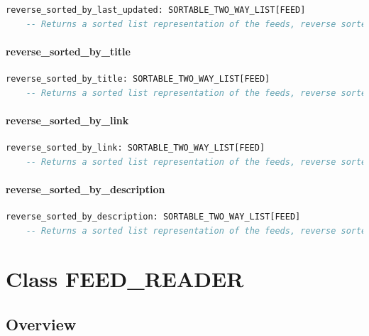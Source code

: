 \begin{lstlisting}[language=Eiffel]
reverse_sorted_by_last_updated: SORTABLE_TWO_WAY_LIST[FEED]
    -- Returns a sorted list representation of the feeds, reverse sorted by `last_updated'
\end{lstlisting}

\subsubsection{reverse\_sorted\_by\_title}

\begin{lstlisting}[language=Eiffel]
reverse_sorted_by_title: SORTABLE_TWO_WAY_LIST[FEED]
    -- Returns a sorted list representation of the feeds, reverse sorted by `title'
\end{lstlisting}

\subsubsection{reverse\_sorted\_by\_link}

\begin{lstlisting}[language=Eiffel]
reverse_sorted_by_link: SORTABLE_TWO_WAY_LIST[FEED]
    -- Returns a sorted list representation of the feeds, reverse sorted by `link'
\end{lstlisting}

\subsubsection{reverse\_sorted\_by\_description}

\begin{lstlisting}[language=Eiffel]
reverse_sorted_by_description: SORTABLE_TWO_WAY_LIST[FEED]
    -- Returns a sorted list representation of the feeds, reverse sorted by `description'
\end{lstlisting}


\chapter{Class FEED\_READER}
\label{cha:feed-reader}

\section{Overview}
\label{sec:feed-reader-overview}

